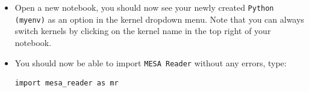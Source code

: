 \documentclass[11pt,a4paper]{article}
\begin{document}
\begin{itemize}
    If for some reason you encounter trouble with the pip install, you can alternatively directly git clone (download) the code from the project's \href{https://github.com/wmwolf/py_mesa_reader}{Github repository} somewhere in your \texttt{home} directory (e.g. \verb|~/codes|)\footnote{\texttt{ \~  } is an alias for your home directory.} by running:
\begin{lstlisting}
  git clone https://github.com/wmwolf/py_mesa_reader.git ~/codes/py_mesa_reader
\end{lstlisting}
    Then run \texttt{python setup.py install} inside the cloned directory.


  Next, we need to register our venv as a Jupyter kernel:

\begin{lstlisting}
 pip install ipykernel     # makes venv able to run noteboooks
 python -m ipykernel install --user --name=myenv --display-name "Python (myenv)"
\end{lstlisting}

this should give you a message like: "Installed kernelspec myenv in ..."


  
  \item Open a new notebook, you should now see your newly created \texttt{Python (myenv)} as an option in the kernel dropdown menu. Note that you can always switch kernels by clicking on the kernel name in the top right of your notebook.
  
  \item You should now be able to import \texttt{MESA Reader} without any errors, type:
  \begin{lstlisting}[style=pythonstyle]
  import mesa_reader as mr
  \end{lstlisting}


\end{itemize}
\end{document}
